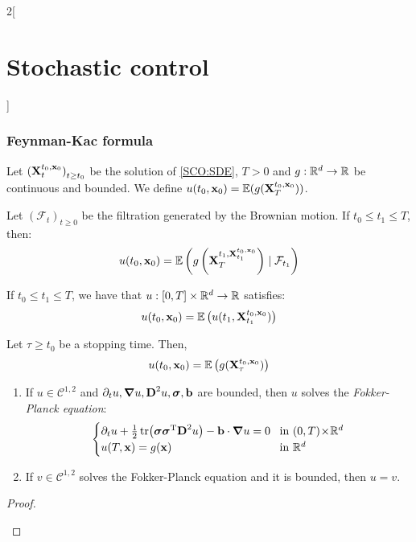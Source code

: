 \documentclass[../../../main_math.tex]{subfiles}
\begin{document}
\begin{multicols}{2}[\section{Stochastic control}]
  \subsubsection{Feynman-Kac formula}
  \begin{definition}
    Let ${(\boldsymbol{\mathrm{X}}_t^{t_0,\boldsymbol{\mathrm{x}}_0})}_{t\geq t_0}$ be the solution of \eqref{SCO:SDE}, $T>0$ and $g:\mathbb{R}^d\to\mathbb{R}$ be continuous and bounded. We define $u(t_0,\boldsymbol{\mathrm{x}}_0)=\mathbb{E}(g(\boldsymbol{\mathrm{X}}_T^{t_0,\boldsymbol{\mathrm{x}}_0}))$.
  \end{definition}
  \begin{proposition}
    Let ${(\mathcal{F}_t)}_{t\geq 0}$ be the filtration generated by the Brownian motion. If $t_0\leq t_1\leq T$, then:
    $$
      u(t_0,\boldsymbol{\mathrm{x}}_0)=\mathbb{E}\left(g\left(\boldsymbol{\mathrm{X}}_T^{t_1,\boldsymbol{\mathrm{X}}_{t_1}^{t_0,\boldsymbol{\mathrm{x}}_0}}\right)\mid \mathcal{F}_{t_1}\right)
    $$
  \end{proposition}
  \begin{theorem}\label{SCO:dynamic_programming}
    If $t_0\leq t_1\leq T$, we have that $u:[0,T]\times\mathbb{R}^d\to\mathbb{R}$ satisfies:
    $$
      u(t_0,\boldsymbol{\mathrm{x}}_0)=\mathbb{E}\left(u(t_1,\boldsymbol{\mathrm{X}}_{t_1}^{t_0,\boldsymbol{\mathrm{x}}_0})\right)
    $$
  \end{theorem}
  \begin{corollary}
    Let $\tau\geq t_0$ be a stopping time. Then, $$u(t_0,\boldsymbol{\mathrm{x}}_0)=\mathbb{E}\left(g(\boldsymbol{\mathrm{X}}_\tau^{t_0,\boldsymbol{\mathrm{x}}_0})\right)$$
  \end{corollary}
  \begin{theorem}\hfill
    \begin{enumerate}
      \item If $u\in\mathcal{C}^{1,2}$ and $\partial_t u,\grad u, \boldsymbol{\mathrm{D}}^2u,\boldsymbol{\mathrm{\sigma}},\boldsymbol{\mathrm{b}}$ are bounded, then $u$ solves the \emph{Fokker-Planck equation}:
            $$
              \begin{cases}
                \partial_tu+\frac{1}{2}\tr(\boldsymbol{\mathrm{\sigma}}{\boldsymbol{\mathrm{\sigma}}}^{\mathrm{T}}\boldsymbol{\mathrm{D}}^2u)-\boldsymbol{\mathrm{b}}\cdot\grad u=0 & \!\text{in }(0,T)\!\times\!\mathbb{R}^d \\
                u(T,\boldsymbol{\mathrm{x}})=g(\boldsymbol{\mathrm{x}})                                                                      & \!\text{in }\mathbb{R}^d
              \end{cases}
            $$
      \item If $v\in \mathcal{C}^{1,2}$ solves the Fokker-Planck equation and it is bounded, then $u=v$.
    \end{enumerate}
  \end{theorem}
  \begin{proof}\hfill
    \begin{enumerate}

\end{enumerate}
\end{proof}
\end{multicols}
\end{document}
